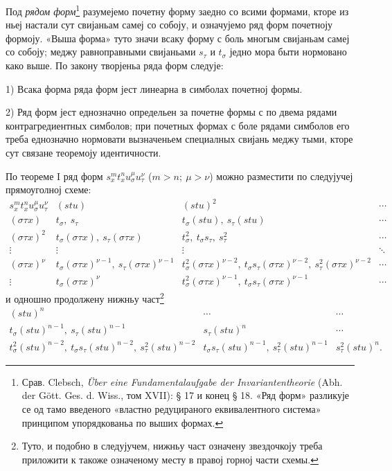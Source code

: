 ﻿\documentclass[11pt]{article}
\begin{document}
Под {\itshape рядом форм}\footnote{Срав. Clebsch, \emph{Über eine Fundamentalaufgabe der Invariantentheorie} (Abh. der Gött. Ges. d. Wiss., том XVII): § 17 и конец § 18. «Ряд форм» разликује се од тамо введеного «властно редуцираного еквивалентного система» принципом упорядкованьа по выших формах.}
разумејемо почетну форму заедно со всими формами, кторе из ньеј настали сут свијаньам самеј со собоју, и означујемо ряд форм почетноју формоју. «Выша форма» туто значи всаку форму с боль многым свијаньам самеј со собоју; меджу равноправными свијаньами $s_\tau$ и $t_\sigma$ једно мора быти нормовано како выше. По закону творјеньа ряда форм следује:

1) Всака форма ряда форм јест линеарна в симболах почетној формы.

2) Ряд форм јест еднозначно определьен за почетне формы с по двема рядами контрагредиентных симболов; при почетных формах с боле рядами симболов его треба еднозначно нормовати вызначеньем специалных свијань меджу тыми, кторе сут связане теоремоју идентичности.

По теореме I ряд форм $s_x^m t_x^n u_\sigma^\mu u_\tau^\nu$ ($m>n;\ \mu>\nu$) можно разместити по следујучеј прямоуголној схеме:
\begingroup\small
\[
\begin{array}{c|c|c|c}
s_x^m t_x^n u_\sigma^\mu u_\tau^\nu
& (stu)
& (stu)^2
& \cdots\\[0.3em]
(\sigma\tau x)
& t_\sigma,\ s_\tau
& t_\sigma(stu),\ s_\tau(stu)
& \cdots\\[0.3em]
(\sigma\tau x)^2
& t_\sigma(\sigma\tau x),\ s_\tau(\sigma\tau x)
& t_\sigma^2,\ t_\sigma s_\tau,\ s_\tau^2
& \cdots\\[0.3em]
\vdots&\vdots&\vdots&\ddots\\[0.3em]
(\sigma\tau x)^\nu
& t_\sigma(\sigma\tau x)^{\nu-1},\ s_\tau(\sigma\tau x)^{\nu-1}
& t_\sigma^2(\sigma\tau x)^{\nu-2},\ t_\sigma s_\tau(\sigma\tau x)^{\nu-2},\ s_\tau^2(\sigma\tau x)^{\nu-2}
& \cdots\\[0.3em]
\vdots
& t_\sigma(\sigma\tau x)^\nu
& t_\sigma^2(\sigma\tau x)^{\nu-1},\ t_\sigma s_\tau(\sigma\tau x)^{\nu-1}
& \cdots
\end{array}
\]
\endgroup
и одношно продолжену нижньу част\footnote{Туто, и подобно в следујучем, нижньу част означену звездочкоју треба приложити к такоже означеному месту в правој горној части схемы.}
\begingroup\small
\[
\begin{array}{c|c|c}
(stu)^n & \cdots & \cdots\\[0.3em]
t_\sigma(stu)^{n-1},\ s_\tau(stu)^{n-1}
& s_\tau(stu)^n & \cdots\\[0.3em]
t_\sigma^2(stu)^{n-2},\ t_\sigma s_\tau(stu)^{n-2},\ s_\tau^2(stu)^{n-2}
& t_\sigma s_\tau(stu)^{n-1},\ s_\tau^2(stu)^{n-1}
& s_\tau^2(stu)^n .
\end{array}
\]
\endgroup
\end{document}

